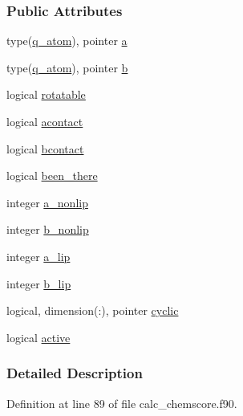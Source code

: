 \subsubsection*{Public Attributes}
\begin{DoxyCompactItemize}
\item 
type(\hyperlink{structcalc__chemscore_1_1q__atom}{q\-\_\-atom}), pointer \hyperlink{structcalc__chemscore_1_1q__bond_ae06bd282fb23881744e5f028f54468f2}{a}
\item 
type(\hyperlink{structcalc__chemscore_1_1q__atom}{q\-\_\-atom}), pointer \hyperlink{structcalc__chemscore_1_1q__bond_a93277ad371a3d42f2f9db5ca5a9851b2}{b}
\item 
logical \hyperlink{structcalc__chemscore_1_1q__bond_aa83f76483887f14b56530a0c6b7fbcdd}{rotatable}
\item 
logical \hyperlink{structcalc__chemscore_1_1q__bond_a89861b90d4150ea23996db8edc60ccfa}{acontact}
\item 
logical \hyperlink{structcalc__chemscore_1_1q__bond_a18fdd505bce8f6acbd49cf99010d05bc}{bcontact}
\item 
logical \hyperlink{structcalc__chemscore_1_1q__bond_a2ac95d010aaab835c13180975ec2eac2}{been\-\_\-there}
\item 
integer \hyperlink{structcalc__chemscore_1_1q__bond_ad21ebce165a91632115adce6d34aa9a5}{a\-\_\-nonlip}
\item 
integer \hyperlink{structcalc__chemscore_1_1q__bond_a238ba76aa6e48069fbf597217892b6a3}{b\-\_\-nonlip}
\item 
integer \hyperlink{structcalc__chemscore_1_1q__bond_a73422cfacd9c20b6d956b351dfb9ccb3}{a\-\_\-lip}
\item 
integer \hyperlink{structcalc__chemscore_1_1q__bond_aa36febc28cb8280703698681883fce2e}{b\-\_\-lip}
\item 
logical, dimension(\-:), pointer \hyperlink{structcalc__chemscore_1_1q__bond_a4571c0cb4812a7c125d3160f07f9e384}{cyclic}
\item 
logical \hyperlink{structcalc__chemscore_1_1q__bond_a2edb791da9cb56771f1a27cab956e665}{active}
\end{DoxyCompactItemize}


\subsubsection{Detailed Description}


Definition at line 89 of file calc\-\_\-chemscore.\-f90.



